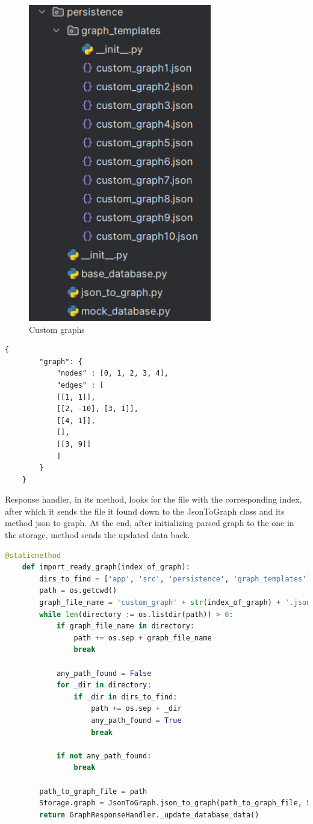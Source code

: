 \begin{figure}[H]
	\centering
	\includegraphics[width=80mm]{images/custom_graphs.png}
	\caption{Custom graphs}
\end{figure}

\begin{lstlisting}[language={Xml}]
	{
		"graph": {
			"nodes" : [0, 1, 2, 3, 4],
			"edges" : [
			[[1, 1]],
			[[2, -10], [3, 1]],
			[[4, 1]],
			[],
			[[3, 9]]
			]
		}
	}
\end{lstlisting}

Response handler, in its method, looks for the file with the corresponding index, after which it sends the file it found down to the JsonToGraph class and its method json to graph. At the end, after initializing parsed graph to the one in the storage, method sends the updated data back.

\begin{lstlisting}[language={python}]
 	@staticmethod
	def import_ready_graph(index_of_graph):
		dirs_to_find = ['app', 'src', 'persistence', 'graph_templates']
		path = os.getcwd()
		graph_file_name = 'custom_graph' + str(index_of_graph) + '.json'
		while len(directory := os.listdir(path)) > 0:
			if graph_file_name in directory:
				path += os.sep + graph_file_name
				break
		
			any_path_found = False
			for _dir in directory:
				if _dir in dirs_to_find:
					path += os.sep + _dir
					any_path_found = True
					break
		
			if not any_path_found:
				break
		
		path_to_graph_file = path
		Storage.graph = JsonToGraph.json_to_graph(path_to_graph_file, Storage.graph.__class__)
		return GraphResponseHandler._update_database_data()
\end{lstlisting}

